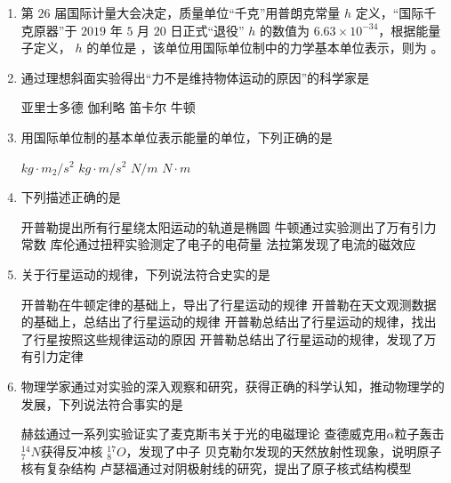 \begin{enumerate}
\item 
{}
第 $ 26 $ 届国际计量大会决定，质量单位“千克”用普朗克常量 $ h $ 定义，“国际千
克原器”于 $ 2019 $ 年 $ 5 $ 月 $ 20 $ 日正式“退役” $ h $ 的数值为 $ 6.63 \times 10^{-34} $，根据能量子定义， $ h $ 的单位是 \underlinegap 
，该单位用国际单位制中的力学基本单位表示，则为 \underlinegap 。


\item 
{}
通过理想斜面实验得出“力不是维持物体运动的原因”的科学家是  

\fourchoices
{亚里士多德}
{伽利略}
{笛卡尔}
{牛顿}



\item
{}
用国际单位制的基本单位表示能量的单位，下列正确的是  

\fourchoices
{$ kg \cdot m_{2}/s^{2} $}
{$ kg \cdot m/s^{2} $}
{$ N/m $}
{$ N \cdot m $}



\item
{}
下列描述正确的是  

\fourchoices
{开普勒提出所有行星绕太阳运动的轨道是椭圆}
{牛顿通过实验测出了万有引力常数}
{库伦通过扭秤实验测定了电子的电荷量}
{法拉第发现了电流的磁效应}



\item 
{}
 关于行星运动的规律，下列说法符合史实的是  
 
\fourchoices
{开普勒在牛顿定律的基础上，导出了行星运动的规律}
{开普勒在天文观测数据的基础上，总结出了行星运动的规律}
{开普勒总结出了行星运动的规律，找出了行星按照这些规律运动的原因}
{开普勒总结出了行星运动的规律，发现了万有引力定律}



\item 
{}
物理学家通过对实验的深入观察和研究，获得正确的科学认知，推动物理学的
发展，下列说法符合事实的是  

\fourchoices
{赫兹通过一系列实验证实了麦克斯韦关于光的电磁理论}
{查德威克用$ \alpha $粒子轰击 $ ^{14}_{7}N $获得反冲核 $ ^{17}_{8}O $，发现了中子}
{贝克勒尔发现的天然放射性现象，说明原子核有复杂结构}
{卢瑟福通过对阴极射线的研究，提出了原子核式结构模型}




\end{enumerate}
